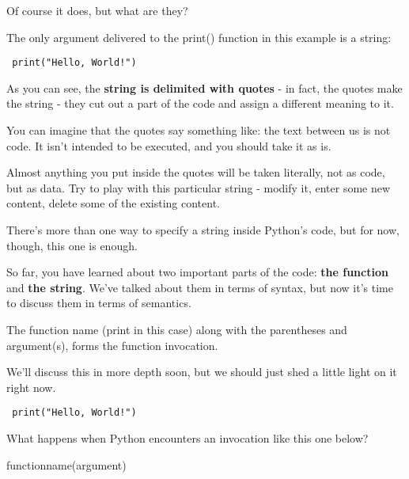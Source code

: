 \documentclass[a4paper,10pt]{article}
\begin{document}
Of course it does, but what are they?
\newline

The only argument delivered to the {\selectfont print()} function in this example is a string:
\begin{verbatim}
 print("Hello, World!")
\end{verbatim}

As you can see, the \textbf{string is delimited with quotes} - in fact, the quotes make the string - they cut out a part of the code and assign a different meaning to it.
\newline

You can imagine that the quotes say something like: the text between us is not code. It isn't intended to be executed, and you should take it as is.
\newline

Almost anything you put inside the quotes will be taken literally, not as code, but as data. Try to play with this particular string - modify it, enter some new content, delete some of the existing content.
\newline

There's more than one way to specify a string inside Python's code, but for now, though, this one is enough.
\newline

So far, you have learned about two important parts of the code: \textbf{the function} and \textbf{the string}. We've talked about them in terms of syntax, but now it's time to discuss them in terms of semantics.
\newline

The function name (print in this case) along with the parentheses and argument(s), forms the function invocation.
\newline

We'll discuss this in more depth soon, but we should just shed a little light on it right now.
\begin{verbatim}
 print("Hello, World!")
\end{verbatim}

What happens when Python encounters an invocation like this one below?
\newline

{\selectfont function\underline{\hspace{.10in}}name(argument)}
\newline
\end{document}
